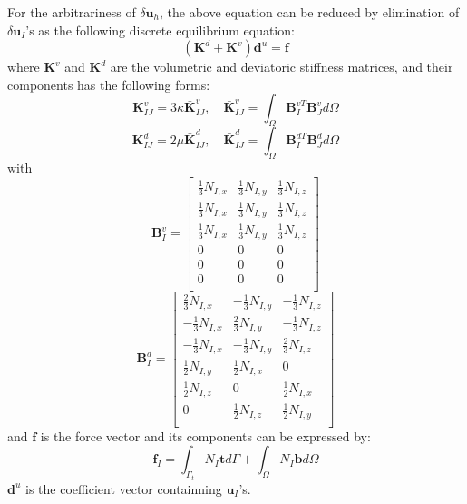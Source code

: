 For the arbitrariness of $\delta \boldsymbol u_h$, the above equation can be reduced by elimination of $\delta \boldsymbol u_I$'s as the following discrete equilibrium equation:
\begin{equation}\label{equilibrium_penalty}
(\boldsymbol K^d + \boldsymbol K^v) \boldsymbol d^u = \boldsymbol f
\end{equation}
where $\boldsymbol K^v$ and $\boldsymbol K^d$ are the volumetric and deviatoric stiffness matrices, and their components has the following forms:
\begin{equation}\label{stiffness_vol}
    \boldsymbol K^v_{IJ}  = 3\kappa \bar{\boldsymbol K}^v_{IJ},  \quad 
    \bar{\boldsymbol K}^v_{IJ}= \int_{\Omega} \boldsymbol B^{vT}_I \boldsymbol B^v_J d\Omega
\end{equation}
\begin{equation}
    \boldsymbol K^d_{IJ} = 2\mu \bar{\boldsymbol K}^d_{IJ}, \quad
    \bar{\boldsymbol K}^d_{IJ}= \int_{\Omega} \boldsymbol B^{dT}_I \boldsymbol B^d_J d\Omega
\end{equation}
with
\begin{equation}
\boldsymbol B^v_I =
\begin{bmatrix}
    \frac{1}{3}N_{I,x} & \frac{1}{3}N_{I,y} & \frac{1}{3}N_{I,z} \\
    \frac{1}{3}N_{I,x} & \frac{1}{3}N_{I,y} & \frac{1}{3}N_{I,z} \\
    \frac{1}{3}N_{I,x} & \frac{1}{3}N_{I,y} & \frac{1}{3}N_{I,z} \\
    0 & 0 & 0 \\
    0 & 0 & 0 \\
    0 & 0 & 0 \\
\end{bmatrix}
\end{equation}
\begin{equation}
\boldsymbol B^d_I = 
\begin{bmatrix}
     \frac{2}{3}N_{I,x} & -\frac{1}{3}N_{I,y} & -\frac{1}{3}N_{I,z} \\
    -\frac{1}{3}N_{I,x} &  \frac{2}{3}N_{I,y} & -\frac{1}{3}N_{I,z} \\
    -\frac{1}{3}N_{I,x} & -\frac{1}{3}N_{I,y} &  \frac{2}{3}N_{I,z} \\
     \frac{1}{2}N_{I,y} &  \frac{1}{2}N_{I,x} & 0 \\
     \frac{1}{2}N_{I,z} & 0                   &  \frac{1}{2}N_{I,x} \\
    0                   &  \frac{1}{2}N_{I,z} &  \frac{1}{2}N_{I,y} \\
\end{bmatrix}
\end{equation}
and $\boldsymbol f$ is the force vector and its components can be expressed by:
\begin{equation}
\boldsymbol f_I = \int_{\Gamma_t} N_I \boldsymbol t d\Gamma + \int_{\Omega} N_I \boldsymbol b d\Omega
\end{equation}
$\boldsymbol d^u$ is the coefficient vector containning $\boldsymbol u_I$'s.

